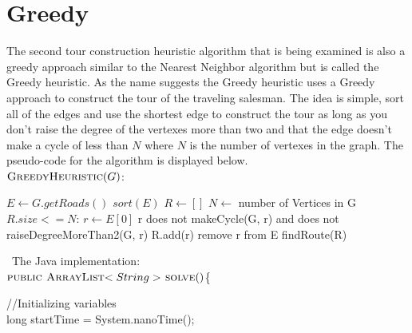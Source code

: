 \documentclass[midd]{thesis}
\newcommand{\tab}{\hspace*{2em}}
\begin{document}
\section{Greedy}
\tab The second tour construction heuristic algorithm that is being examined is also a greedy approach similar to the Nearest Neighbor algorithm but is called the Greedy heuristic. As the name suggests the Greedy heuristic uses a Greedy approach to construct the tour of the traveling salesman. The idea is simple, sort all of the edges and use the shortest edge to construct the tour as long as you don't raise the degree of the vertexes more than two and that the edge doesn't make a cycle of less than $N$ where $N$ is the number of vertexes in the graph. The pseudo-code for the algorithm is displayed below.\\
$\textnormal{\scshape GreedyHeuristic}(G)$:
\begin{codebox}
\li $E \gets G.getRoads()$
\li $sort(E)$
\li $R \gets []$
\li $N \gets$ number of Vertices in G
\li\While $R.size <= N$:
\li $r \gets E[0]$
\li \If r does not makeCycle(G, r) and does not raiseDegreeMoreThan2(G, r)
\li R.add(r) \End 
\li remove r from E \End
\li\Return findRoute(R)
\end{codebox}\
The Java implementation:\\
$\textnormal{\scshape public ArrayList$<String>$ solve}()$\{
\begin{codebox}
\tab//Initializing variables\\
\tab long startTime = System.nanoTime();\\	
\end{codebox}
\end{document}
